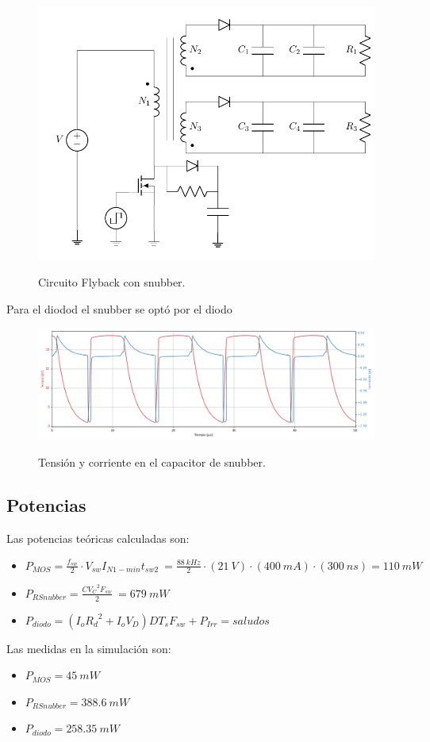 \begin{figure}[H]
	\centering
	\includegraphics[width=0.4\linewidth, page = 1]{ImagenesParteII/FlybackSnubber.pdf}
	\label{fig:fly_snubber}
	\caption{Circuito Flyback con snubber.}
\end{figure}
Para el diodod el snubber se optó por el diodo 
\begin{figure}[H]
	\centering
	\includegraphics[width=0.9\linewidth]{ImagenesParteII/Cap_snub.png}
	\label{fig:tensionesvarias}
	\caption{Tensión y corriente en el capacitor de snubber.}
\end{figure}

\subsection{Potencias}
Las potencias teóricas calculadas son:
\begin{itemize}
\item $ P_{MOS} =\frac{f_{sw}}{2}\cdot V_{sw}I_{N1-min} t_{sw2}\ =\frac{88 \ kHz}{2}\cdot (21 \ V) \cdot (400 \ mA) \cdot (300 \ ns) = 110\ mW$
\item $ P_{RSnubber} = \frac{C{V_C}^2 F_{sw}}{2}\ = 679 \ mW$
\item $P_{diodo} = (I_o{R_d}^2 + I_oV_D)DT_sF_{sw} + P_{Irr} = saludos$ 

\end{itemize}
Las medidas en la simulación son:
\begin{itemize}
\item $ P_{MOS} = 45 \ mW $
\item $ P_{RSnubber} = 388.6 \ mW$
\item $ P_{diodo} = 258.35 \ mW$
\end{itemize}


